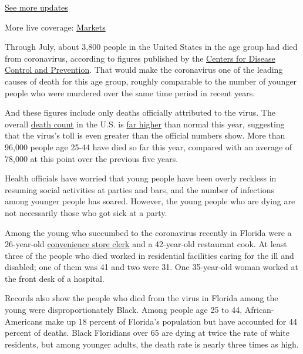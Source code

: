 \href{https://www.nytimes3xbfgragh.onion/2020/08/20/world/coronavirus-covid.html?action=click\&pgtype=Article\&state=default\&region=MAIN_CONTENT_1\&context=storylines_live_updates}{See
more updates}

More live coverage:
\href{https://www.nytimes3xbfgragh.onion/live/2020/08/20/business/stock-market-today-coronavirus?action=click\&pgtype=Article\&state=default\&region=MAIN_CONTENT_1\&context=storylines_live_updates}{Markets}

Through July, about 3,800 people in the United States in the age group
had died from coronavirus, according to figures published by the
\href{https://data.cdc.gov/NCHS/Weekly-counts-of-deaths-by-jurisdiction-and-age-gr/y5bj-9g5w/}{Centers
for Disease Control and Prevention}. That would make the coronavirus one
of the leading causes of death for this age group, roughly comparable to
the number of younger people who were murdered over the same time period
in recent years.

And these figures include only deaths officially attributed to the
virus. The overall
\href{https://www.cdc.gov/nchs/nvss/vsrr/covid19/excess_deaths.htm}{death
count} in the U.S. is
\href{https://www.nytimes3xbfgragh.onion/interactive/2020/05/05/us/coronavirus-death-toll-us.html}{far
higher} than normal this year, suggesting that the virus's toll is even
greater than the official numbers show. More than 96,000 people age
25-44 have died so far this year, compared with an average of 78,000 at
this point over the previous five years.

Health officials have worried that young people have been overly
reckless in resuming social activities at parties and bars, and the
number of infections among younger people has soared. However, the young
people who are dying are not necessarily those who got sick at a party.

Among the young who succumbed to the coronavirus recently in Florida
were a 26-year-old
\href{https://www.palmbeachpost.com/news/20200716/community-remembers-florida-woman-rsquodesirsquo-who-died-of-covid-19-after-going-to-work-with-respiratory-symptoms}{convenience
store clerk} and a 42-year-old restaurant cook. At least three of the
people who died worked in residential facilities caring for the ill and
disabled; one of them was 41 and two were 31. One 35-year-old woman
worked at the front desk of a hospital.

Records also show the people who died from the virus in Florida among
the young were disproportionately Black. Among people age 25 to 44,
African-Americans make up 18 percent of Florida's population but have
accounted for 44 percent of deaths. Black Floridians over 65 are dying
at twice the rate of white residents, but among younger adults, the
death rate is nearly three times as high.

